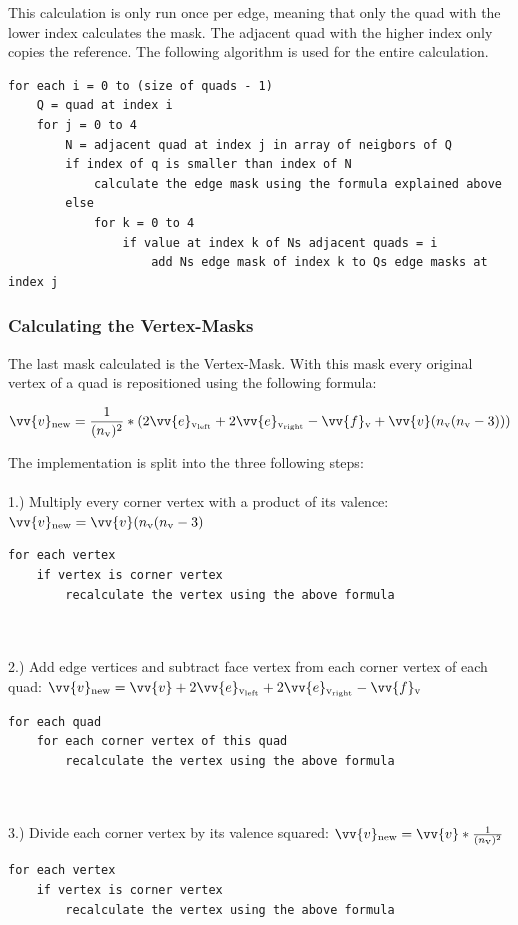 \documentclass[12pt,a4paper]{scrartcl}
\begin{document}
This calculation is only run once per edge, meaning that only the quad with the lower index calculates the mask. The adjacent quad with the higher index only copies the reference. The following algorithm is used for the entire calculation.
\begin{lstlisting}[language=PSEUDO]
for each i = 0 to (size of quads - 1)
	Q = quad at index i
	for j = 0 to 4
		N = adjacent quad at index j in array of neigbors of Q
		if index of q is smaller than index of N
			calculate the edge mask using the formula explained above
		else
			for k = 0 to 4
				if value at index k of Ns adjacent quads = i
					add Ns edge mask of index k to Qs edge masks at index j		
\end{lstlisting}

\subsubsection{Calculating the Vertex-Masks}
The last mask calculated is the Vertex-Mask. With this mask every original vertex of a quad is repositioned using the following formula:

$$ \vv{v}\textsubscript{new} = \frac{1}{(n\textsubscript{v})^{2}}*(2 \vv{e}\textsubscript{v\textsubscript{left}} + 2 \vv{e}\textsubscript{v\textsubscript{right}} - \vv{f}\textsubscript{v} +\vv{v} (n\textsubscript{v}(n\textsubscript{v}-3))) $$

The implementation is split into the three following steps:\\
\ \\
1.) Multiply every corner vertex with a product of its valence: $ \vv{v}\textsubscript{new} = \vv{v} (n\textsubscript{v}(n\textsubscript{v}-3)$
\begin{lstlisting}[language=PSEUDO]
for each vertex
	if vertex is corner vertex
		recalculate the vertex using the above formula
\end{lstlisting}
\ \\
\ \\
2.) Add edge vertices and subtract face vertex from each corner vertex of each quad: $\vv{v}\textsubscript{new} = \vv{v} + 2 \vv{e}\textsubscript{v\textsubscript{left}} + 2 \vv{e}\textsubscript{v\textsubscript{right}} - \vv{f}\textsubscript{v}$
\begin{lstlisting}[language=PSEUDO]
for each quad
	for each corner vertex of this quad
		recalculate the vertex using the above formula
\end{lstlisting}
\ \\
\ \\
3.) Divide each corner vertex by its valence squared: $ \vv{v}\textsubscript{new} = \vv{v} * \frac{1}{(n\textsubscript{v})^{2}}$
\begin{lstlisting}[language=PSEUDO]
for each vertex
	if vertex is corner vertex
		recalculate the vertex using the above formula
\end{lstlisting}
\end{document}
